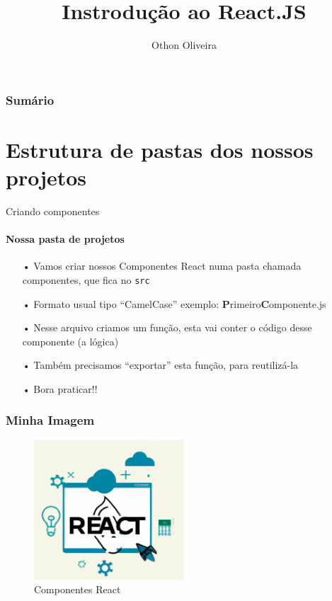 \documentclass[13pt, xcolor={dvipsnames,svgnames}, portuguese]{beamer}
\author{Othon Oliveira}
\title{Instrodução ao React.JS}
\institute{SENAC - PROA}
\date{}
\begin{document}
\begin{frame}
\titlepage
\end{frame}

\newcommand{\capa}{
    \begin{tikzpicture}[remember picture,overlay]
        \node at (current page.south west)
            {\begin{tikzpicture}[remember picture, overlay]
                \fill[shading=radial,top color=orange,bottom color=orange,middle color=yellow] (0,0) rectangle (\paperwidth,\paperheight);
            \end{tikzpicture}
          };
    \end{tikzpicture}
}

\begin{frame}\frametitle{Sumário}
\tableofcontents
\end{frame}


\section{Estrutura de pastas dos nossos projetos}
\begin{frame}{Criando componentes}
\framesubtitle{Nossa pasta de projetos}
\begin{itemize}
	\item[•] Vamos criar nossos Componentes React numa pasta chamada componentes, que fica no \texttt{src}
	\item[•] Formato usual tipo ``CamelCase'' exemplo: \textbf{P}rimeiro\textbf{C}omponente.js
	\item[•] Nesse arquivo criamos um função, esta vai conter o código desse componente (a lógica)
	\item[•] Também precisamos ``exportar'' esta função, para reutilizá-la
	\item[•] Bora praticar!!
\end{itemize}
\end{frame}





\begin{frame}
\frametitle{Minha Imagem}
\begin{figure}
\centering
\includegraphics[width=0.5\textwidth]{Figuras/react1.png}
\caption{Componentes React}
\end{figure}
\end{frame}
\end{document}
